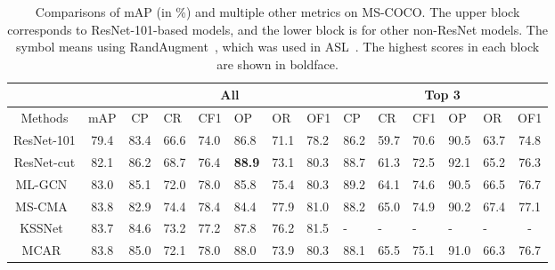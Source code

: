 \documentclass[10pt,twocolumn,letterpaper]{article}
\begin{document}
\begin{table*}
	\caption{Comparisons of mAP (in \%) and multiple other metrics on MS-COCO. The upper block corresponds to ResNet-101-based models, and the lower block is for other non-ResNet models. The  symbol means using RandAugment~\cite{randaugment}, which was used in ASL~\cite{ASL_2020_arxiv}. The highest scores in each block are shown in boldface.}
	\label{tab:mscoco}
	\centering
	\small
	\begin{tabular}{c|c|clllll | lllllc}
		\hline
		&      & \multicolumn{6}{c|}{All} & \multicolumn{6}{c}{Top 3}                  \\ 
		\hline
		Methods                      & mAP           & CP                       & CR                        & CF1           & OP            & OR            & OF1           & CP            & CR            & CF1           & OP            & OR            & OF1           \\ \hline\hline
		ResNet-101                    & 79.4          & 83.4                     & 66.6                      & 74.0          & 86.8          & 71.1          & 78.2          & 86.2          & 59.7          & 70.6          & 90.5          & 63.7          & 74.8          \\
		ResNet-cut                    & 82.1          & 86.2                     & 68.7                      & 76.4          & \textbf{88.9}  & 73.1          & 80.3          & 88.7          & 61.3          & 72.5          & 92.1          & 65.2          & 76.3          \\
		ML-GCN~\cite{2019_CVPR_GCN}  & 83.0          & 85.1                     & 72.0                      & 78.0          & 85.8          & 75.4          & 80.3          & 89.2          & 64.1          & 74.6          & 90.5          & 66.5          & 76.7          \\
		MS-CMA~\cite{2020_AAAI_CMA}  & 83.8          & 82.9                     & 74.4                      & 78.4          & 84.4          & 77.9          & 81.0          & 88.2          & 65.0          & 74.9          & 90.2          & 67.4          & 77.1          \\
		KSSNet~\cite{2018_ACM_KD}    & 83.7          & 84.6                     & 73.2                      & 77.2          & 87.8          & 76.2          & 81.5          & -             & -             & -             & -             & -             & -             \\
		MCAR~\cite{2020_arxiv_Gaobb} & 83.8          & 85.0                     & 72.1                      & 78.0          & 88.0          & 73.9          & 80.3          & 88.1          & 65.5          & 75.1          & 91.0          & 66.3          & 76.7          \\

\end{tabular}
\end{table*}
\end{document}
